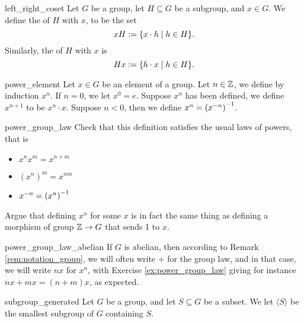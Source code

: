 \begin{cdef}{}{left_right_coset}
    Let \( G \) be a group, let \( H \subseteq G \) be a subgroup, and \( x \in G \). We define the  of \( H \) with \( x \), to be the set
    \begin{equation*}
        x H := \{ x \cdot h \mid h \in H \}.
    \end{equation*}
    Similarly, the  of \( H \) with \( x \) is
    \begin{equation*}
        H x := \{ h \cdot x \mid h \in H \}.
    \end{equation*}
\end{cdef}

\begin{cdef}{}{power_element}
    Let \( x \in G \) be an element of a group. Let \( n \in \mathbb{Z} \), we define by induction \( x^n \). If \( n = 0 \), we let \( x^0 = e \). Suppose \( x^n \) has been defined, we define \( x^{n + 1} \) to be \( x^n \cdot x \). Suppose \( n < 0 \), then we define \( x^n = {(x^{-n})}^{-1} \).
\end{cdef}

\begin{cex}{}{power_group_law}
    Check that this definition satisfies the usual laws of powers, that is
    \begin{itemize}
        \item \( x^n x^m = x^{n + m} \)
        \item \( (x^n)^m = x^{nm} \)
        \item \( x^{-n} = {(x^n)}^{-1}\)
    \end{itemize}
    Argue that defining \( x^n \) for some \( x \) is in fact the same thing as defining a morphism of group \( \mathbb{Z} \to G \) that sends 1 to \( x \).
\end{cex}

\begin{crem}{}{power_group_law_abelian}
    If \( G \) is abelian, then according to Remark \ref*{rem:notation_group}, we will often write \( + \) for the group law, and in that case, we will write \( nx \) for \( x^n \), with Exercise \ref{ex:power_group_law} giving for instance \( nx + mx = (n + m)x \), as expected.
\end{crem}


\begin{cdef}{}{subgroup_generated}
    Let \( G \) be a group, and let \( S \subseteq G \) be a subset. We let \( \langle S \rangle \) be the smallest subgroup of \( G \) containing \( S \).
\end{cdef}


